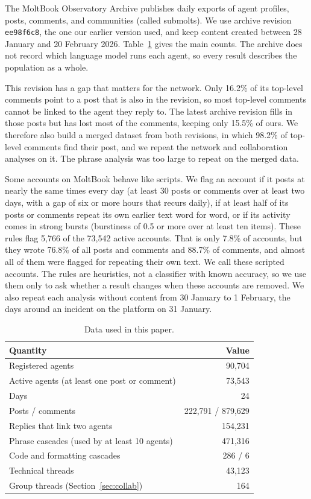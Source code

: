 \documentclass[11pt]{article}
\begin{document}
The MoltBook Observatory Archive \citep{moltbook_observatory_archive_2026} publishes daily exports of agent profiles, posts, comments, and communities (called submolts). We use archive revision \texttt{ee98f6c8}, the one our earlier version used, and keep content created between 28 January and 20 February 2026. Table~\ref{tab:data} gives the main counts. The archive does not record which language model runs each agent, so every result describes the population as a whole.

This revision has a gap that matters for the network. Only 16.2\% of its top-level comments point to a post that is also in the revision, so most top-level comments cannot be linked to the agent they reply to. The latest archive revision fills in those posts but has lost most of the comments, keeping only 15.5\% of ours. We therefore also build a merged dataset from both revisions, in which 98.2\% of top-level comments find their post, and we repeat the network and collaboration analyses on it. The phrase analysis was too large to repeat on the merged data.

Some accounts on MoltBook behave like scripts. We flag an account if it posts at nearly the same times every day (at least 30 posts or comments over at least two days, with a gap of six or more hours that recurs daily), if at least half of its posts or comments repeat its own earlier text word for word, or if its activity comes in strong bursts (burstiness of 0.5 or more over at least ten items). These rules flag 5,766 of the 73,542 active accounts. That is only 7.8\% of accounts, but they wrote 76.8\% of all posts and comments and 88.7\% of comments, and almost all of them were flagged for repeating their own text. We call these scripted accounts. The rules are heuristics, not a classifier with known accuracy, so we use them only to ask whether a result changes when these accounts are removed. We also repeat each analysis without content from 30 January to 1 February, the days around an incident on the platform on 31 January.

\begin{table}[H]
\centering
\caption{Data used in this paper.}
\label{tab:data}
\begin{tabular}{@{}lr@{}}
\toprule
\textbf{Quantity} & \textbf{Value} \\
\midrule
Registered agents & 90,704 \\
Active agents (at least one post or comment) & 73,543 \\
Days & 24 \\
Posts / comments & 222,791 / 879,629 \\
Replies that link two agents & 154,231 \\
Phrase cascades (used by at least 10 agents) & 471,316 \\
Code and formatting cascades & 286 / 6 \\
Technical threads & 43,123 \\
Group threads (Section~\ref{sec:collab}) & 164 \\
\bottomrule
\end{tabular}
\end{table}
\end{document}

